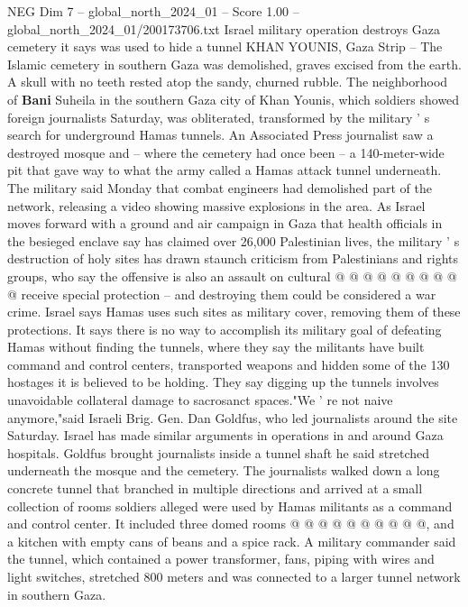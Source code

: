 \begin{textsample}{NEG Dim 7 – global\_north\_2024\_01 – Score 1.00 – global\_north\_2024\_01/200173706.txt}  \label{ex:f7_neg_268}
Israel military operation destroys Gaza cemetery it says was used to hide a tunnel KHAN YOUNIS, Gaza Strip -- The Islamic cemetery in southern Gaza was demolished, graves excised from the earth.
A skull with no teeth rested atop the sandy, churned rubble.
The neighborhood of \textbf{Bani} Suheila in the southern Gaza city of Khan Younis, which soldiers showed foreign journalists Saturday, was obliterated, transformed by the military ' s search for underground Hamas tunnels.
An Associated Press journalist saw a destroyed mosque and -- where the cemetery had once been -- a 140-meter-wide pit that gave way to what the army called a Hamas attack tunnel underneath.
The military said Monday that combat engineers had demolished part of the network, releasing a video showing massive explosions in the area.
As Israel moves forward with a ground and air campaign in Gaza that health officials in the besieged enclave say has claimed over 26,000 Palestinian lives, the military ' s destruction of holy sites has drawn staunch criticism from Palestinians and rights groups, who say the offensive is also an assault on cultural @ @ @ @ @ @ @ @ @ @ receive special protection -- and destroying them could be considered a war crime.
Israel says Hamas uses such sites as military cover, removing them of these protections.
It says there is no way to accomplish its military goal of defeating Hamas without finding the tunnels, where they say the militants have built command and control centers, transported weapons and hidden some of the 130 hostages it is believed to be holding.
They say digging up the tunnels involves unavoidable collateral damage to sacrosanct spaces."We ' re not naive anymore,"said Israeli Brig.
Gen.
Dan Goldfus, who led journalists around the site Saturday.
Israel has made similar arguments in operations in and around Gaza hospitals.
Goldfus brought journalists inside a tunnel shaft he said stretched underneath the mosque and the cemetery.
The journalists walked down a long concrete tunnel that branched in multiple directions and arrived at a small collection of rooms soldiers alleged were used by Hamas militants as a command and control center.
It included three domed rooms @ @ @ @ @ @ @ @ @ @, and a kitchen with empty cans of beans and a spice rack.
A military commander said the tunnel, which contained a power transformer, fans, piping with wires and light switches, stretched 800 meters and was connected to a larger tunnel network in southern Gaza.

\end{textsample}
